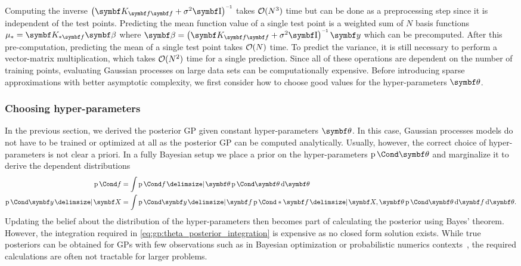 Computing the inverse $\left(\mat{K}_{\mat{f}\mat{f}} + \sigma^2 \Eye \right)\inv$ takes $\operatorname{\mathcal{O}}(N^3)$ time but can be done as a preprocessing step since it is independent of the test points.
Predicting the mean function value of a single test point is a weighted sum of $N$ basis functions $\mu_\ast = \mat{K_{\ast \mat{f}}} \mat{\beta}$ where $\mat{\beta} = \left(\mat{K}_{\mat{f}\mat{f}} + \sigma^2 \Eye \right)\inv \mat{y}$ which can be precomputed.
After this pre-computation, predicting the mean of a single test point takes $\operatorname{\mathcal{O}}(N)$ time.
To predict the variance, it is still necessary to perform a vector-matrix multiplication, which takes $\operatorname{\mathcal{O}}(N^2)$ time for a single prediction.
Since all of these operations are dependent on the number of training points, evaluating Gaussian processes on large data sets can be computationally expensive.
Before introducing sparse approximations with better asymptotic complexity, we first consider how to choose good values for the hyper-parameters $\mat{\theta}$.

\subsubsection{Choosing hyper-parameters}
In the previous section, we derived the posterior GP given constant hyper-parameters $\mat{\theta}$.
In this case, Gaussian processes models do not have to be trained or optimized at all as the posterior GP can be computed analytically.
Usually, however, the correct choice of hyper-parameters is not clear a priori.
In a fully Bayesian setup we place a prior on the hyper-parameters $\Prob{\mat{\theta}}$ and marginalize it to derive the dependent distributions
\begin{equation}
    \begin{split}
        \label{eq:gp:theta_posterior_integration}
        \Prob{f}
        & = \int \Prob{f \given \mat{\theta}} \Prob{\mat{\theta}} \diff \mat{\theta}                                                           \\
        \Prob{\mat{y} \given \mat{X}}
        & = \int \Prob{\mat{y} \given \mat{f}} \Prob*{\mat{f} \given \mat{X}, \mat{\theta}} \Prob{\mat{\theta}} \diff \mat{f} \diff \mat{\theta}.
    \end{split}
\end{equation}
Updating the belief about the distribution of the hyper-parameters then becomes part of calculating the posterior using Bayes' theorem.
However, the integration required in \cref{eq:gp:theta_posterior_integration} is expensive as no closed form solution exists.
While true posteriors can be obtained for GPs with few observations such as in Bayesian optimization or probabilistic numerics contexts~\parencite{shahriari_taking_2016,oates_modern_2019}, the required calculations are often not tractable for larger problems.

